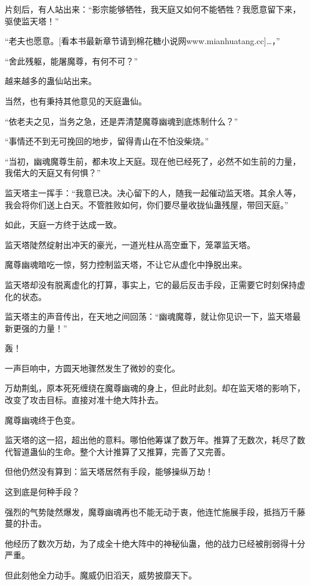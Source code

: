 
\begin{this_body}

片刻后，有人站出来：“影宗能够牺牲，我天庭又如何不能牺牲？我愿意留下来，驱使监天塔！”

“老夫也愿意。[看本书最新章节请到棉花糖小说网www.mianhuatang.cc]…，”

“舍此残躯，能屠魔尊，有何不可？”

越来越多的蛊仙站出来。

当然，也有秉持其他意见的天庭蛊仙。

“依老夫之见，当务之急，还是弄清楚魔尊幽魂到底炼制什么？”

“事情还不到无可挽回的地步，留得青山在不怕没柴烧。”

“当初，幽魂魔尊生前，都未攻上天庭。现在他已经死了，必然不如生前的力量，我偌大的天庭又有何惧？”

监天塔主一挥手：“我意已决。决心留下的人，随我一起催动监天塔。其余人等，我会将你们送上白天。不管胜败如何，你们要尽量收拢仙蛊残屋，带回天庭。”

如此，天庭一方终于达成一致。

监天塔陡然绽射出冲天的豪光，一道光柱从高空垂下，笼罩监天塔。

魔尊幽魂暗吃一惊，努力控制监天塔，不让它从虚化中挣脱出来。

监天塔却没有脱离虚化的打算，事实上，它的最后反击手段，正需要它时刻保持虚化的状态。

监天塔主的声音传出，在天地之间回荡：“幽魂魔尊，就让你见识一下，监天塔最新更强的力量！”

轰！

一声巨响中，方圆天地骤然发生了微妙的变化。

万劫荆虬，原本死死缠绕在魔尊幽魂的身上，但此时此刻。却在监天塔的影响下，改变了攻击目标。直接对准十绝大阵扑去。

魔尊幽魂终于色变。

监天塔的这一招，超出他的意料。哪怕他筹谋了数万年。推算了无数次，耗尽了数代智道蛊仙的生命。整个大计推算了又推算，完善了又完善。

但他仍然没有算到：监天塔居然有手段，能够操纵万劫！

这到底是何种手段？

强烈的气势陡然爆发，魔尊幽魂再也不能无动于衷，他连忙施展手段，抵挡万千藤蔓的扑击。

他经历了数次万劫，为了成全十绝大阵中的神秘仙蛊，他的战力已经被削弱得十分严重。

但此刻他全力动手。魔威仍旧滔天，威势披靡天下。


\end{this_body}
